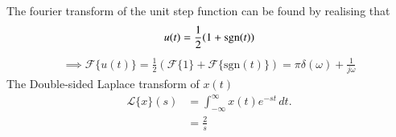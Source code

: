 \documentclass[journal,12pt,twocolumn]{IEEEtran}
\begin{document}
The fourier transform of the unit step function can be found by realising that
\begin{align}
u(t)=\frac12(1+\mathop{\mathrm{sgn}}(t))    
\end{align}
\begin{align}
 \implies   \mathcal{F}\{u(t)\}=\frac12\left(\mathcal{F}\{1\}+\mathcal{F}\{\text{sgn}(t)\}\right)=\pi\delta(\omega)+\frac{1}{j\omega}
\end{align}
The Double-sided Laplace transform of $x(t)$
\begin{align}
    \mathcal{L}\{x\}(s) &= \int_{-\infty}^{\infty} x(t)e^{-st} \, dt.\\
    &=\frac{2}{s}
\end{align}
\end{document}

